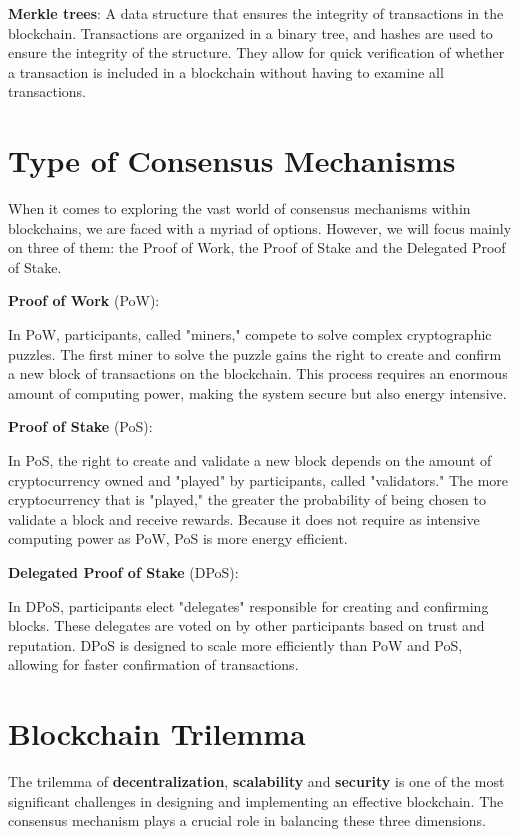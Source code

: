 \begin{remark}
\textbf{Merkle trees}:
A data structure that ensures the integrity of transactions in the blockchain.
Transactions are organized in a binary tree, and hashes are used to ensure the integrity of the structure.
They allow for quick verification of whether a transaction is included in a blockchain without having to examine all transactions.
\end{remark}


\section{Type of Consensus Mechanisms}
When it comes to exploring the vast world of consensus mechanisms within blockchains, we are faced with a myriad of options. However, we will focus mainly on three of them: the Proof of Work, the Proof of Stake and the Delegated Proof of Stake. 

\faBitcoin \quad \textbf{Proof of Work} (PoW):

In PoW, participants, called "miners," compete to solve complex cryptographic puzzles.
The first miner to solve the puzzle gains the right to create and confirm a new block of transactions on the blockchain.
This process requires an enormous amount of computing power, making the system secure but also energy intensive.

\faEthereum \quad \textbf{Proof of Stake} (PoS):

In PoS, the right to create and validate a new block depends on the amount of cryptocurrency owned and "played" by participants, called "validators."
The more cryptocurrency that is "played," the greater the probability of being chosen to validate a block and receive rewards.
Because it does not require as intensive computing power as PoW, PoS is more energy efficient.

\faUsers \quad \textbf{Delegated Proof of Stake} (DPoS):

In DPoS, participants elect "delegates" responsible for creating and confirming blocks.
These delegates are voted on by other participants based on trust and reputation.
DPoS is designed to scale more efficiently than PoW and PoS, allowing for faster confirmation of transactions. 

\section{Blockchain Trilemma}


The trilemma of \textbf{decentralization}, \textbf{scalability} and \textbf{security} is one of the most significant challenges in designing and implementing an effective blockchain. The consensus mechanism plays a crucial role in balancing these three dimensions.

